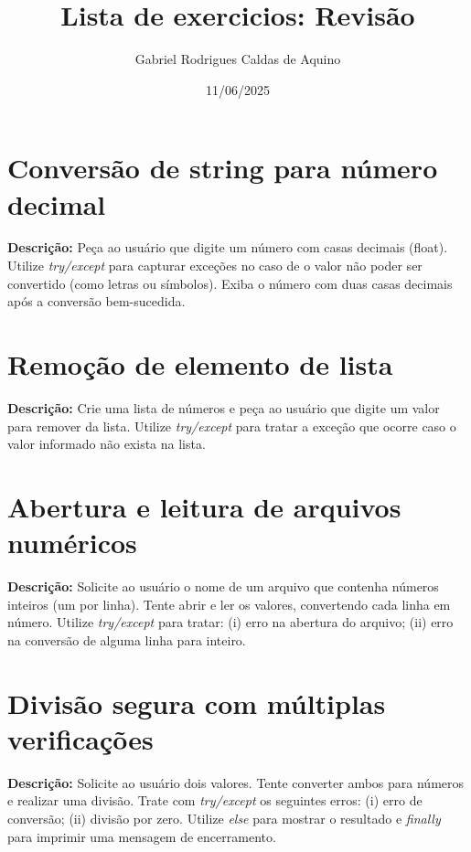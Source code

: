 \title{Lista de exercicios: Revisão}
\author{Gabriel Rodrigues Caldas de Aquino}
\date{11/06/2025}



\maketitle

\section{Conversão de string para número decimal}

\textbf{Descrição:}  
Peça ao usuário que digite um número com casas decimais (float). Utilize \textit{try/except} para capturar exceções no caso de o valor não poder ser convertido (como letras ou símbolos). Exiba o número com duas casas decimais após a conversão bem-sucedida.

\section{Remoção de elemento de lista}

\textbf{Descrição:}  
Crie uma lista de números e peça ao usuário que digite um valor para remover da lista. Utilize \textit{try/except} para tratar a exceção que ocorre caso o valor informado não exista na lista.

\section{Abertura e leitura de arquivos numéricos}

\textbf{Descrição:}  
Solicite ao usuário o nome de um arquivo que contenha números inteiros (um por linha). Tente abrir e ler os valores, convertendo cada linha em número. Utilize \textit{try/except} para tratar: (i) erro na abertura do arquivo; (ii) erro na conversão de alguma linha para inteiro.

\section{Divisão segura com múltiplas verificações}

\textbf{Descrição:}  
Solicite ao usuário dois valores. Tente converter ambos para números e realizar uma divisão. Trate com \textit{try/except} os seguintes erros: (i) erro de conversão; (ii) divisão por zero. Utilize \textit{else} para mostrar o resultado e \textit{finally} para imprimir uma mensagem de encerramento.

